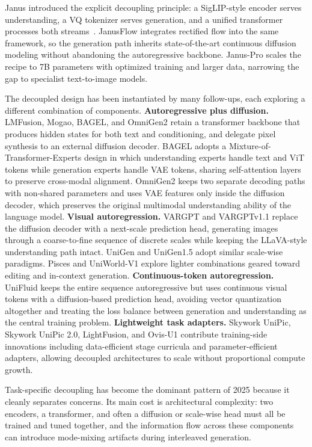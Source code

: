 \documentclass[manuscript,screen,review]{acmart}
\begin{document}
Janus introduced the explicit decoupling principle: a SigLIP-style
encoder serves understanding, a VQ tokenizer serves generation, and a
unified transformer processes both streams~\cite{wu2024janus}.
JanusFlow integrates rectified flow into the same framework, so the
generation path inherits state-of-the-art continuous diffusion
modeling without abandoning the autoregressive backbone. Janus-Pro
scales the recipe to 7B parameters with optimized training and larger
data, narrowing the gap to specialist text-to-image models.

The decoupled design has been instantiated by many follow-ups, each
exploring a different combination of components.
\textbf{Autoregressive plus diffusion.} LMFusion, Mogao, BAGEL, and
OmniGen2 retain a transformer backbone that produces hidden states for
both text and conditioning, and delegate pixel synthesis to an external
diffusion decoder. BAGEL adopts a Mixture-of-Transformer-Experts design
in which understanding experts handle text and ViT tokens while
generation experts handle VAE tokens, sharing self-attention layers to
preserve cross-modal alignment. OmniGen2 keeps two separate decoding
paths with non-shared parameters and uses VAE features only inside the
diffusion decoder, which preserves the original multimodal
understanding ability of the language model.
\textbf{Visual autoregression.} VARGPT and VARGPTv1.1 replace the
diffusion decoder with a next-scale prediction head, generating images
through a coarse-to-fine sequence of discrete scales while keeping the
LLaVA-style understanding path intact. UniGen and UniGen1.5 adopt
similar scale-wise paradigms. Pisces and UniWorld-V1 explore lighter
combinations geared toward editing and in-context generation.
\textbf{Continuous-token autoregression.} UniFluid keeps the entire
sequence autoregressive but uses continuous visual tokens with a
diffusion-based prediction head, avoiding vector quantization
altogether and treating the loss balance between generation and
understanding as the central training problem.
\textbf{Lightweight task adapters.} Skywork UniPic, Skywork UniPic 2.0,
LightFusion, and Ovis-U1 contribute training-side innovations
including data-efficient stage curricula and parameter-efficient
adapters, allowing decoupled architectures to scale without
proportional compute growth.

Task-specific decoupling has become the dominant pattern of 2025
because it cleanly separates concerns. Its main cost is architectural
complexity: two encoders, a transformer, and often a diffusion or
scale-wise head must all be trained and tuned together, and the
information flow across these components can introduce mode-mixing
artifacts during interleaved generation.
\end{document}
